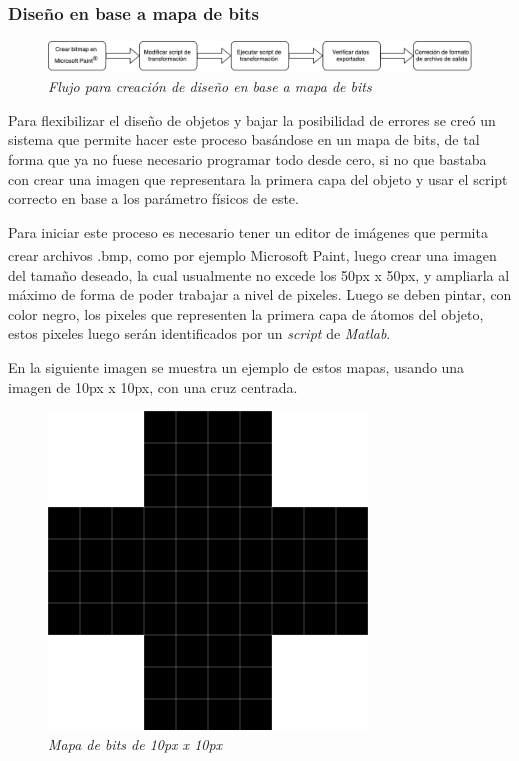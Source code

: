 \subsubsection{Diseño en base a mapa de bits}
\label{intro:procesoactualmapa}

\noindent
\begin{figure}[H]
  \centering
  \includegraphics[scale=.5]{images/procesoActualBitmapFlujo}
  \caption{\em Flujo para creación de diseño en base a mapa de bits}
\end{figure}

Para flexibilizar el diseño de objetos y bajar la posibilidad de errores se creó un sistema que permite hacer este proceso basándose en un mapa de bits, de tal forma que ya no fuese necesario programar todo desde cero, si no que bastaba con crear una imagen que representara la primera capa del objeto y usar el script correcto en base a los parámetro físicos de este.

Para iniciar este proceso es necesario tener un editor de imágenes que permita crear archivos .bmp, como por ejemplo Microsoft Paint\textsuperscript{\textregistered}, luego crear una imagen del tamaño deseado, la cual usualmente no excede los 50px x 50px, y ampliarla al máximo de forma de poder trabajar a nivel de pixeles. Luego se deben pintar, con color negro, los pixeles que representen la primera capa de átomos del objeto, estos pixeles luego serán identificados por un \emph{script} de \emph{Matlab}.

En la siguiente imagen se muestra un ejemplo de estos mapas, usando una imagen de 10px x 10px, con una cruz centrada.

\begin{figure}[H]
  \centering
  \includegraphics[scale=.6]{images/procesoActualBitmap}
  \caption{\em Mapa de bits de 10px x 10px}
\end{figure}

